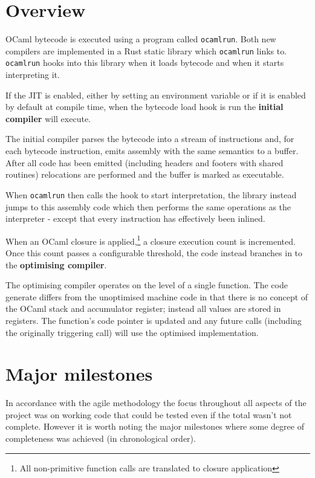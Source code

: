 \section{Overview}

OCaml bytecode is executed using a program called \texttt{ocamlrun}. Both new compilers are
implemented in a Rust static library which \texttt{ocamlrun} links to. \texttt{ocamlrun} hooks into
this library when it loads bytecode and when it starts interpreting it.

If the JIT is enabled, either by setting an environment variable or if it is enabled by default at
compile time, when the bytecode load hook is run the \textbf{initial compiler} will execute.

The initial compiler parses the bytecode into a stream of instructions and, for each bytecode
instruction, emits assembly with the same semantics to a buffer. After all code has been emitted
(including headers and footers with shared routines) relocations are performed and the buffer is
marked as executable.

When \texttt{ocamlrun} then calls the hook to start interpretation, the library instead jumps to
this assembly code which then performs the same operations as the interpreter - except that every
instruction has effectively been inlined.

When an OCaml closure is applied,\footnote{All non-primitive function calls are translated to
      closure application} a closure execution count is incremented. Once this count passes a
configurable
threshold, the code instead branches in to the \textbf{optimising compiler}.

The optimising compiler operates on the level of a single function. The code generate differs from
the unoptimised machine code in that there is no concept of the OCaml stack and accumulator
register; instead all values are stored in registers. The function's code pointer is updated and
any
future calls (including the originally triggering call) will use the optimised implementation.

\section{Major milestones}

In accordance with the agile methodology the focus throughout all aspects of the project was on
working code that could be tested even if the total wasn't not complete. However it is worth noting
the major milestones where some degree of completeness was achieved (in chronological order).

